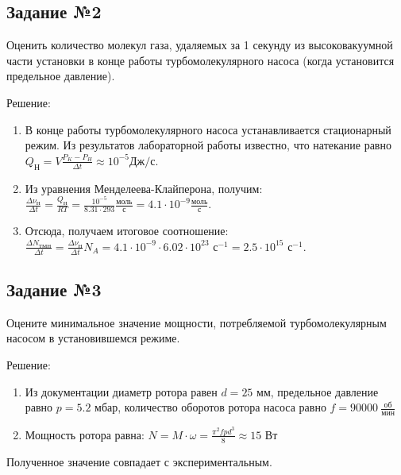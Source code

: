 \documentclass[a4paper, 12pt]{article}
\begin{document}

        \subsection*{Задание №2}
            Оценить количество молекул газа, удаляемых за 1 секунду из высоковакуумной части установки в конце работы турбомолекулярного насоса (когда установится предельное давление).

            Решение:
            \begin{enumerate}
                \item В конце работы турбомолекулярного насоса устанавливается стационарный режим. Из результатов лабораторной работы известно, что натекание равно $Q_{\text{Н}} = V\frac{P_K-P_H}{\Delta t} \approx 10^{-5} \text{Дж/с}$. 
                
                \item Из уравнения Менделеева-Клайперона, получим: $\frac{\Delta \nu_{\text{Н}}}{\Delta t} = \frac{Q_{\text{Н}}}{RT} = \frac{10^{-5}}{8.31 \cdot 293} \frac{\text{моль}}{\text{с}} = 4.1 \cdot 10^{-9} \frac{\text{моль}}{\text{с}}$.
                
                \item Отсюда, получаем итоговое соотношение: $\frac{\Delta N_{\text{ТМН}}}{\Delta t}= \frac{\Delta \nu_{\text{Н}}}{\Delta t}N_{A} = 4.1 \cdot 10^{-9} \cdot 6.02 \cdot 10^{23} \text{ с}^{-1}= 2.5 \cdot 10^{15} \text{ с}^{-1}$.            
            \end{enumerate}


        \subsection*{Задание №3}
            Оцените минимальное значение мощности, потребляемой турбомолекулярным насосом в установившемся режиме.

            Решение:
            \begin{enumerate}
                \item Из документации диаметр ротора равен $d = 25 \text{ мм}$, предельное давление равно $p = 5.2 \text{ мбар}$, количество оборотов ротора насоса равно $f = 90000 \: \frac{\text{об}}{\text{мин}}$
                \item Мощность ротора равна: $N = M \cdot \omega = \frac{\pi^2 fp d^3}{8} \approx 15 \text{ Вт}$
            \end{enumerate}

            Полученное значение совпадает с экспериментальным.

            
\end{document}
